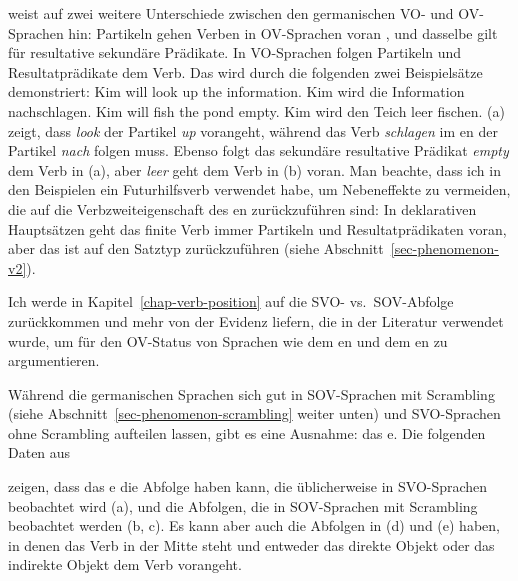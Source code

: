 \textcites[]{Haider2010a}[Abschnitt~15.2]{Haider2020a} weist auf zwei weitere Unterschiede zwischen den germanischen VO- und OV-Sprachen hin:
Partikeln gehen Verben in OV-Sprachen voran \citep[Abschnitt~2.4]{Vikner2001a}, und dasselbe gilt für resultative sekundäre
Prädikate. In VO-Sprachen folgen Partikeln und Resultatprädikate dem Verb. Das wird durch
die folgenden zwei Beispielsätze demonstriert:
\eal
\ex Kim will look up the information.
\ex
Kim wird die Information nachschlagen.\german
\zl
\eal
\ex Kim will fish the pond empty.
\ex
Kim wird den Teich leer fischen.\german
\zl
(a) zeigt, dass \emph{look} der Partikel \emph{up} vorangeht, während das Verb \emph{schlagen}
im en der Partikel \emph{nach} folgen muss. Ebenso folgt das sekundäre resultative
Prädikat \emph{empty} dem Verb in (a), aber \emph{leer} geht dem Verb in
(b) voran. Man beachte, dass ich in den Beispielen ein Futurhilfsverb verwendet habe, um Nebeneffekte zu vermeiden, die
auf die Verbzweiteigenschaft des en zurückzuführen sind: In deklarativen Hauptsätzen geht das finite Verb immer
Partikeln und Resultatprädikaten voran, aber das ist auf den Satztyp zurückzuführen (siehe Abschnitt~\ref{sec-phenomenon-v2}).

Ich werde in Kapitel~\ref{chap-verb-position} auf die SVO- vs.\ SOV-Abfolge zurückkommen und mehr von der
Evidenz liefern, die in der Literatur verwendet wurde, um für den OV-Status von Sprachen wie dem en und dem en zu argumentieren.

Während die germanischen Sprachen sich gut in SOV-Sprachen mit Scrambling (siehe
Abschnitt~\ref{sec-phenomenon-scrambling} weiter unten) und SVO-Sprachen ohne Scrambling aufteilen lassen, gibt es eine
Ausnahme: das e. Die folgenden Daten aus \begin{NoHyper}\end{NoHyper} zeigen, dass das e
die Abfolge haben kann, die üblicherweise in SVO-Sprachen beobachtet wird (a), und die Abfolgen, die in SOV-Sprachen
mit Scrambling beobachtet werden (b, c). Es kann aber auch die Abfolgen in (d) und
(e) haben, in denen das Verb in der Mitte steht und entweder das direkte Objekt oder das indirekte Objekt
dem Verb vorangeht.


